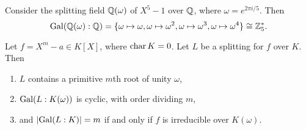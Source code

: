 \begin{example}
  Consider the splitting field $\mathbb{Q}(\omega)$ of $X^5 - 1$
  over $\mathbb{Q}$, where $\omega = e^{2\pi i / 5}$. Then
  \[
    \operatorname{Gal}(\mathbb{Q}(\omega) : \mathbb{Q})
    = \{\omega \mapsto \omega, \omega \mapsto \omega^2, \omega \mapsto \omega^3, \omega \mapsto \omega^4\}
    \cong \mathbb{Z}_5^*.
  \]
\end{example}

\begin{theorem}
  Let $f = X^m - a \in K[X]$, where $\operatorname{char} K = 0$.
  Let $L$ be a splitting for $f$ over $K$. Then
  \begin{enumerate}
    \item $L$ contains a primitive $m$th root of unity $\omega$,
    \item $\operatorname{Gal}(L : K(\omega))$ is cyclic, with
      order dividing $m$,
    \item and $|{\operatorname{Gal}(L : K)}| = m$ if and only if
      $f$ is irreducible over $K(\omega)$.
  \end{enumerate}
\end{theorem}

